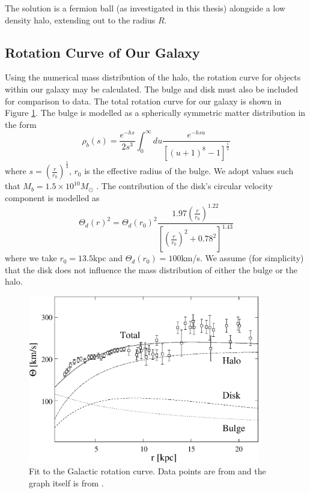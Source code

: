 The solution is a fermion ball (as investigated in this thesis) alongside a low density halo, extending out to the radius $R$.

\subsection{Rotation Curve of Our Galaxy}
Using the numerical mass distribution of the halo, the rotation curve for objects within our galaxy may be calculated. The bulge
and disk must also be included for comparison to data. The total rotation curve for our galaxy is shown
in Figure \ref{fig_halorotation}. The bulge is modelled as a spherically symmetric matter distribution \cite{ref_halobulge} in the form
\begin{equation}
	\rho_b(s)=\frac{e^{-hs}}{2s^3} \int^\infty_0 du \frac{e^{-hsu}}{\left[ (u+1)^8 -1\right]^{\frac{1}{2}}}
	\label{eqn_halobulge}
\end{equation}
where $s=\left( \frac{r}{r_0} \right)^{\frac{1}{4}}$, $r_0$ is the effective radius of the bulge. We adopt values such that
$M_b=1.5\times 10^{10}M_\odot$ \cite{ref_halobulgevalues}.
The contribution of the disk's circular velocity component is modelled as \cite{ref_halodisk}
\begin{equation}
	\Theta_d(r)^2=\Theta_d(r_0)^2\frac{1.97 \left( \frac{r}{r_0}\right)^{1.22}}{\left[\left( \frac{r}{r_0}\right)^2 +0.78^2 \right]^{1.43}}
	\label{eqn_halodisk}
\end{equation}
where we take $r_0=13.5$kpc and $\Theta_d(r_0)=100$km/s. We assume (for simplicity) that the disk does not influence the mass distribution of
either the bulge or the halo.
\begin{figure}[t]
	\begin{center}
	\includegraphics[width=0.9\textwidth]{eps/halo.eps}
	\caption{Fit to the Galactic rotation curve. Data points are from \cite{ref_halodata} and the graph itself is from \cite{ref_halo}.}
	\label{fig_halorotation}
	\end{center}
\end{figure}

